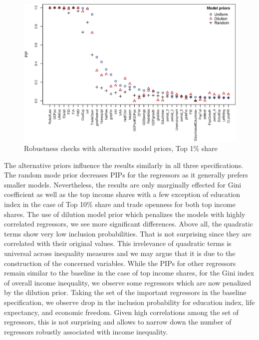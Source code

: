 \begin{refsection}
\begin{figure}[ht!]
  \caption{Robustness checks with alternative model priors, Top 1\% share}
  \label{ch4fig:top1_comp}
  \centering
  \includegraphics[width=\textwidth, keepaspectratio]{figures/ch4/model_priors_comparison_top1}
\end{figure}

The alternative priors influence the results similarly in all three specifications. The random mode prior decreases \acp{PIP} for the regressors as it generally prefers smaller models. Nevertheless, the results are only marginally effected for Gini coefficient as well as the top income shares with a few exception of education index in the case of Top 10\% share and trade openness for both top income shares. The use of dilution model prior which penalizes the models with highly correlated regressors, we see more significant differences. Above all, the quadratic terms show very low inclusion probabilities. That is not surprising since they are correlated with their original values. This irrelevance of quadratic terms is universal across inequality measures and we may argue that it is due to the construction of the concerned variables. While the \acp{PIP} for other regressors remain similar to the baseline in the case of top income shares, for the Gini index of overall income inequality, we observe some regressors which are now penalized by the dilution prior. Taking the set of the important regressors in the baseline specification, we observe drop in the inclusion probability for education index, life expectancy, and economic freedom. Given high correlations among the set of regressors, this is not surprising and allows to narrow down the number of regressors robustly associated with income inequality.


\end{refsection}
